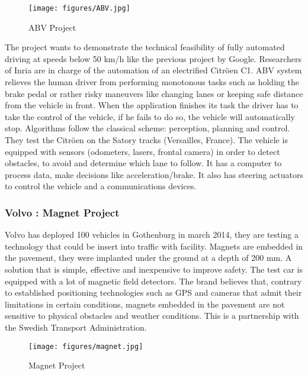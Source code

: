 \documentclass[a4paper]{article}
\begin{document}
\begin{figure}[!htb]
\begin{center}
\texttt{[image: figures/ABV.jpg]}
\caption{ABV Project}
\end{center}
\end{figure}
The project wants to demonstrate the technical feasibility of fully automated driving at speeds below 50 km/h like the previous project by Google. Researchers of Inria are in charge of the automation of an electrified Citr\"{o}en C1. ABV system relieves the human driver from performing monotonous tasks such as holding the brake pedal or rather risky maneuvers like changing lanes or keeping safe distance from the vehicle in front. When the application finishes its task the driver has to take the control of the vehicle, if he fails to do so, the vehicle will automatically stop. Algorithms follow the classical scheme: perception, planning and control. They test the Citr\"{o}en on the Satory tracks (Versailles, France). The vehicle is equipped with sensors (odometers, lasers, frontal camera) in order to detect obstacles, to avoid and determine which lane to follow. It has a computer to process data, make decisions like acceleration/brake. It also has steering actuators to control the vehicle and a communications devices.

\subsubsection{Volvo : Magnet Project}

Volvo has deployed 100 vehicles in Gothenburg in march 2014, they are testing a technology that could be insert into traffic with facility. Magnets are embedded in the pavement, they were implanted under the ground at a depth of 200 mm. A solution that is simple, effective and inexpensive to improve safety. The test car is equipped with a lot of magnetic field detectors. The brand believes that, contrary to established positioning technologies such as GPS and cameras that admit their limitations in certain conditions, magnets embedded in the pavement are not sensitive to physical obstacles and weather conditions. This is a partnership with the Swedish Transport Administration.
\begin{figure}[!htb]
\begin{center}
\texttt{[image: figures/magnet.jpg]}
\caption{Magnet Project}
\end{center}
\end{figure}
\end{document}
